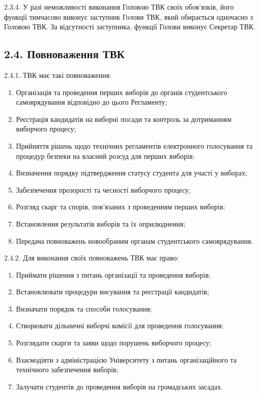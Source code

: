     2.3.4. У разі неможливості виконання Головою ТВК своїх обов'язків, його функції тимчасово виконує заступник Голови ТВК, який обирається одночасно з Головою ТВК. За відсутності заступника, функції Голови виконує Секретар ТВК.

\subsection*{2.4. Повноваження ТВК}
    2.4.1. ТВК має такі повноваження:

        \begin{enumerate}[label=\alph*)]
            \item Організація та проведення перших виборів до органів студентського самоврядування відповідно до цього Регламенту;
            \item Реєстрація кандидатів на виборні посади та контроль за дотриманням виборчого процесу;
            \item Прийняття рішень щодо технічних регламентів електронного голосування та процедур безпеки на власний розсуд для перших виборів;
            \item Визначення порядку підтвердження статусу студента для участі у виборах;
            \item Забезпечення прозорості та чесності виборчого процесу;
            \item Розгляд скарг та спорів, пов'язаних з проведенням перших виборів;
            \item Встановлення результатів виборів та їх оприлюднення;
            \item Передача повноважень новообраним органам студентського самоврядування.
        \end{enumerate}

    2.4.2. Для виконання своїх повноважень ТВК має право:

        \begin{enumerate}[label=\alph*)]
            \item Приймати рішення з питань організації та проведення виборів;
            \item Встановлювати процедури висування та реєстрації кандидатів;
            \item Визначати порядок та способи голосування;
            \item Створювати дільничні виборчі комісії для проведення голосування;
            \item Розглядати скарги та заяви щодо порушень виборчого процесу;
            \item Взаємодіяти з адміністрацією Університету з питань організаційного та технічного забезпечення виборів;
            \item Залучати студентів до проведення виборів на громадських засадах.
        \end{enumerate}

